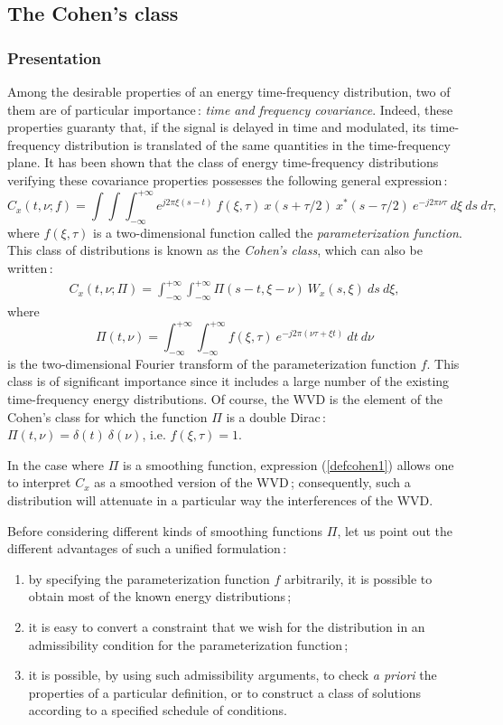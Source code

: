 \subsection{The Cohen's class}
\label{cohendef}
\subsubsection{Presentation}

  Among the desirable properties of an energy time-frequency distribution,
two of them are of particular importance\,: {\it time and frequency
covariance}. Indeed, these properties guaranty that, if the signal is
delayed in time and modulated, its time-frequency distribution is
translated of the same quantities in the time-frequency plane. It has been
shown that the class of energy time-frequency distributions verifying these
covariance properties possesses the following general expression\,:
\[C_x(t,\nu;f)=\int\int\int_{-\infty}^{+\infty}
e^{j2\pi \xi(s-t)}\ f(\xi,\tau)\ x(s+\tau/2)\ x^*(s-\tau/2)\ e^{-j2\pi \nu
\tau}\ d\xi\ ds\ d\tau,\] where $f(\xi,\tau)$ is a two-dimensional function
called the {\it parameterization function}. This class of distributions is known as the {\it Cohen's class},
which can also be written\,:
\begin{eqnarray}
\label{defcohen1}
C_x(t,\nu;\Pi)=\int_{-\infty}^{+\infty}\int_{-\infty}^{+\infty}
\Pi(s-t,\xi-\nu)\ W_x(s,\xi)\ ds\ d\xi, 
\end{eqnarray}
where 
\[\Pi(t,\nu)=\int_{-\infty}^{+\infty}\int_{-\infty}^{+\infty} f(\xi,\tau)\
e^{-j2\pi(\nu \tau+\xi t)}\ dt\ d\nu\]  
is the two-dimensional Fourier transform of the parameterization function
$f$. This class is of significant importance since it includes a large number
of the existing time-frequency energy distributions.  Of course, the WVD is
the element of the Cohen's class for which the function $\Pi$ is a double
Dirac\,: $\Pi(t,\nu)=\delta(t)\ \delta(\nu)$, i.e. $f(\xi,\tau)=1$.

  In the case where $\Pi$ is a smoothing function, expression
(\ref{defcohen1}) allows one to interpret $C_x$ as a smoothed version of
the WVD\,; consequently, such a distribution will attenuate in a particular
way the interferences of the WVD.

  Before considering different kinds of smoothing functions $\Pi$, let us
point out the different advantages of such a unified formulation\,:
\begin{enumerate}
\item by specifying the parameterization function $f$ arbitrarily, it is
possible to obtain most of the known energy distributions\,;
\item it is easy to convert a constraint that we wish for the distribution
in an admissibility condition for the parameterization function\,;
\item it is possible, by using such admissibility arguments, to
check {\it a priori} the properties of a particular definition, or to construct a
class of solutions according to a specified schedule of conditions.
\end{enumerate}

